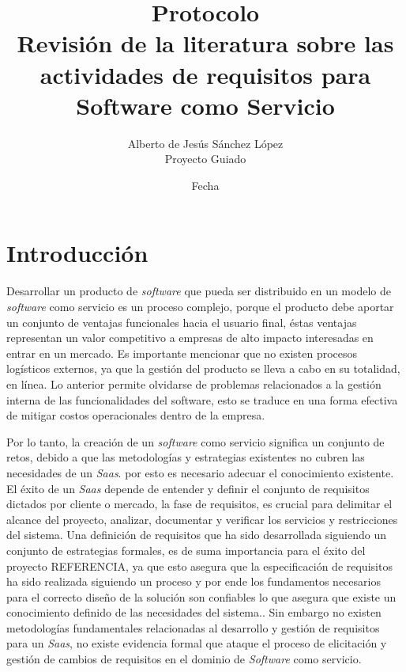 \documentclass{article}
\begin{document}
  \title{%
  Protocolo \\
  \large Revisión de la literatura sobre las actividades de requisitos para Software como Servicio\\}
  \author{Alberto de Jesús Sánchez López \\ 
  \small Proyecto Guiado}
  \date{Fecha}
  \maketitle
  \thispagestyle{empty}
  \newpage

  \tableofcontents
  \thispagestyle{empty}
  \newpage

\setcounter{page}{1}
\section{Introducción}
Desarrollar un producto de \emph{software} que pueda ser distribuido en un modelo de \emph{software} como servicio 
es un proceso complejo, porque el  producto debe aportar un conjunto de ventajas funcionales hacia el usuario final, 
éstas ventajas representan un valor competitivo a empresas de alto impacto interesadas en entrar en un mercado. Es importante 
mencionar que no existen procesos logísticos externos, ya que la gestión del producto se lleva a cabo en su totalidad, en línea.
Lo anterior permite olvidarse de problemas relacionados a la gestión interna de las funcionalidades del software, 
esto se traduce en una forma efectiva de mitigar costos operacionales dentro de la empresa. 

Por lo tanto, la creación de un \emph{software} como servicio significa un conjunto de retos, debido a que las 
metodologías y estrategias existentes no cubren las necesidades de un \emph{Saas}. por esto es necesario adecuar el conocimiento 
existente. El éxito de un \emph{Saas} depende de entender y definir el conjunto de requisitos dictados por cliente o mercado, 
la fase de requisitos, es crucial para delimitar el alcance del proyecto, analizar, documentar y verificar los servicios y restricciones del sistema. 
Una definición de requisitos que ha sido desarrollada siguiendo un conjunto de estrategias formales,  
es de suma importancia para el éxito del proyecto REFERENCIA, ya que esto asegura que la especificación de requisitos ha sido 
realizada siguiendo un proceso y por ende los fundamentos necesarios para el correcto diseño de la solución son confiables
lo que asegura que existe un conocimiento definido de las necesidades del sistema..
Sin embargo no existen metodologías fundamentales relacionadas al desarrollo y gestión de requisitos para un \emph{Saas}, no existe evidencia 
formal que ataque el proceso de elicitación y gestión de cambios de requisitos en el dominio de \emph{Software} como servicio. 
\end{document}

